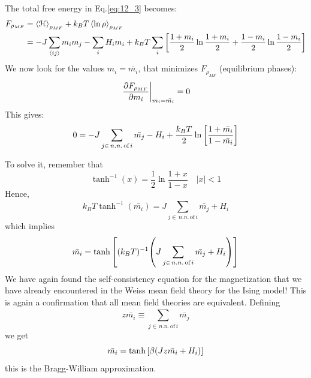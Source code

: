 \documentclass[../main/main.tex]{subfiles}
\begin{document}
The total free energy in Eq.\eqref{eq:12_3} becomes:
\begin{equation}
\begin{split}
  F_{\rho _{MF}} &= \expval{\mathcal{H}}_{\rho _{MF}} + k_B T \expval{\ln{\rho } }_{\rho _{MF}} \\
  & = - J \sum_{\expval{ij} }^{} m_i m_j - \sum_{i}^{} H_i m_i
  + k_B T   \sum_{i}^{} \qty[ \frac{1+m_i}{2} \ln{\frac{1+m_i}{2}} + \frac{1-m_i}{2} \ln{\frac{1-m_i}{2}} ]
\end{split}
\end{equation}
We now look for the values \( m_i = \bar{m_i}  \), that minimizes \( F_{\rho _{MF}} \) (equilibrium phases):
\begin{equation*}
 \eval{ \pdv{F_{\rho _{MF}} }{m_i} }_{m_i = \bar{m_i} } = 0
\end{equation*}
This gives:
\begin{equation*}
  0 = - J \sum_{j \in \, n.n. \,\text{of}\, i}^{} \bar{m_j} - H_i + \frac{k_B T}{2} \ln{\qty[\frac{1+\bar{m_i} }{1- \bar{m_i} }] }
\end{equation*}

To solve it, remember that
\begin{equation*}
  \tanh^{-1} (x) = \frac{1}{2} \ln{\frac{1+x}{1-x}} \quad |x| < 1
\end{equation*}
Hence,
\begin{equation*}
  k_B T \tanh^{-1} ( \bar{m_i} ) = J \sum_{j \in \, n.n. \,\text{of}\, i}^{} \bar{m_j} + H_i
\end{equation*}
which implies
\begin{equation*}
  \bar{m_i} = \tanh \qty[(k_B T)^{-1} \qty(J \sum_{j \in \, n.n. \,\text{of}\, i}^{} \bar{m_j} + H_i ) ]
\end{equation*}
We have again found the self-consistency equation for the magnetization that we have already encountered in the Weiss mean field theory for the Ising model! This is again a confirmation that all mean field theories are equivalent.
Defining
\begin{equation*}
  z \bar{m_i} \equiv  \sum_{j \in \, n.n. \,\text{of}\, i}^{} \bar{m_j}
\end{equation*}
we get
\begin{equation}
  \bar{m_i} = \tanh \qty[\beta \qty(Jz \bar{m_i} +H_i) ]
\end{equation}
this is the Bragg-William approximation.
\end{document}
